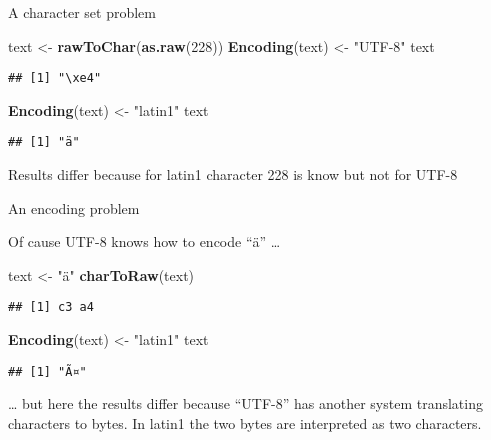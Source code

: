 \documentclass[ignorenonframetext,]{beamer}
\newenvironment{Shaded}{\begin{snugshade}}{\end{snugshade}}
\newcommand{\KeywordTok}[1]{\textcolor[rgb]{0.13,0.29,0.53}{\textbf{{#1}}}}
\newcommand{\DecValTok}[1]{\textcolor[rgb]{0.00,0.00,0.81}{{#1}}}
\newcommand{\StringTok}[1]{\textcolor[rgb]{0.31,0.60,0.02}{{#1}}}
\newcommand{\NormalTok}[1]{{#1}}
\begin{document}
\begin{frame}[fragile]{A character set problem}

\begin{Shaded}
\begin{Highlighting}[]
\NormalTok{text           <-}\StringTok{ }\KeywordTok{rawToChar}\NormalTok{(}\KeywordTok{as.raw}\NormalTok{(}\DecValTok{228}\NormalTok{))}
\KeywordTok{Encoding}\NormalTok{(text) <-}\StringTok{ "UTF-8"} 
\NormalTok{text}
\end{Highlighting}
\end{Shaded}

\begin{verbatim}
## [1] "\xe4"
\end{verbatim}

\begin{Shaded}
\begin{Highlighting}[]
\KeywordTok{Encoding}\NormalTok{(text) <-}\StringTok{ "latin1"} 
\NormalTok{text}
\end{Highlighting}
\end{Shaded}

\begin{verbatim}
## [1] "ä"
\end{verbatim}

Results differ because for latin1 character 228 is know but not for
UTF-8

\end{frame}

\begin{frame}[fragile]{An encoding problem}

Of cause UTF-8 knows how to encode ``ä'' \ldots{}

\begin{Shaded}
\begin{Highlighting}[]
\NormalTok{text <-}\StringTok{ "ä"}
\KeywordTok{charToRaw}\NormalTok{(text)}
\end{Highlighting}
\end{Shaded}

\begin{verbatim}
## [1] c3 a4
\end{verbatim}

\begin{Shaded}
\begin{Highlighting}[]
\KeywordTok{Encoding}\NormalTok{(text) <-}\StringTok{ "latin1"}
\NormalTok{text}
\end{Highlighting}
\end{Shaded}

\begin{verbatim}
## [1] "Ã¤"
\end{verbatim}

\ldots{} but here the results differ because ``UTF-8'' has another
system translating characters to bytes. In latin1 the two bytes are
interpreted as two characters.

\end{frame}
\end{document}
